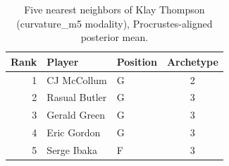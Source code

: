 \begin{table}[htbp]
  \centering\small
  \begin{tabular}{rllc}
    \toprule
    Rank & Player & Position & Archetype \\
    \midrule
    1 & CJ McCollum & G & 2 \\
    2 & Rasual Butler & G & 3 \\
    3 & Gerald Green & G & 3 \\
    4 & Eric Gordon & G & 3 \\
    5 & Serge Ibaka & F & 3 \\
    \bottomrule
  \end{tabular}
  \caption{Five nearest neighbors of Klay Thompson (curvature_m5 modality), Procrustes-aligned posterior mean.}
  \label{tab:Klay_Thompson_neighbors_curvature_m5}
\end{table}


